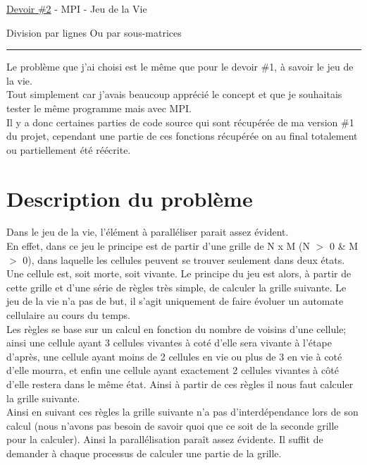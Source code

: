 \documentclass[10pt,a4paper]{article}
\begin{document}
\begin{center}
\begin{large}
\underline{Devoir \#2} - MPI - Jeu de la Vie \\
\vspace{0.25cm}
\begin{footnotesize}
Division par lignes Ou par sous-matrices \\
\end{footnotesize}
\noindent\rule{4cm}{0.4pt}
\end{large}
\end{center}

\indent Le problème que j'ai choisi est le même que pour le devoir \#1, à savoir le jeu de la vie.\\
Tout simplement car j'avais beaucoup apprécié le concept et que je souhaitais tester le même programme mais avec MPI.\\
\indent Il y a donc certaines parties de code source qui sont récupérée de ma version \#1 du projet, cependant une partie de ces fonctions récupérée on au final totalement ou partiellement été réécrite.

\section{Description du problème}

Dans le jeu de la vie, l'élément à paralléliser parait assez évident. \\
En effet, dans ce jeu le principe est de partir d'une grille de N x M (N $>$ 0 \& M $>$ 0), dans laquelle les cellules peuvent se trouver seulement dans deux états. Une cellule est, soit morte, soit vivante. 
Le principe du jeu est alors, à partir de cette grille et d'une série de règles très simple, de calculer la grille suivante. 
Le jeu de la vie n'a pas de but, il s'agit uniquement de faire évoluer un automate cellulaire au cours du temps.\\
\indent Les règles se base sur un calcul en fonction du nombre de voisins d'une cellule; ainsi une cellule ayant 3 cellules vivantes à coté d'elle sera vivante à l'étape d'après, une cellule ayant moins de 2 cellules en vie ou plus de 3 en vie à coté d'elle mourra, et enfin une cellule ayant exactement 2 cellules vivantes à côté d'elle restera dans le même état. Ainsi à partir de ces règles il nous faut calculer la grille suivante. \\

Ainsi en suivant ces règles la grille suivante n'a pas d'interdépendance lors de son calcul (nous n'avons pas besoin de savoir quoi que ce soit de la seconde grille pour la calculer). Ainsi la parallélisation paraît assez évidente. Il suffit de demander à chaque processus de calculer une partie de la grille. \\
\end{document}
